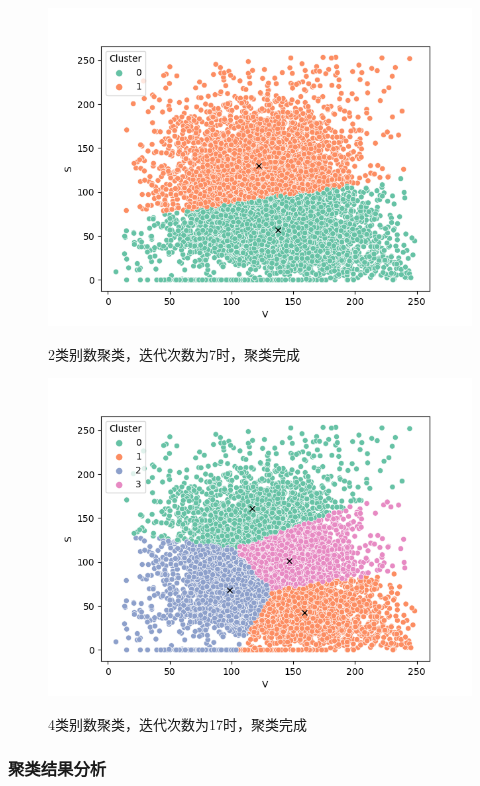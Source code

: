 \documentclass[UTF8]{ctexart}
\begin{document}
	\begin{figure}[htbp]
		\centering
		\caption{2类别数聚类，迭代次数为7时，聚类完成}
		\includegraphics[width=1.0\textwidth]{cluster_final2.png}
		\label{Fig.45}
	\end{figure}

	\begin{figure}[htbp]
	\centering
	\caption{4类别数聚类，迭代次数为17时，聚类完成}
	\includegraphics[width=1.0\textwidth]{cluster_final4.png}
	\label{Fig.46}
	\end{figure}

	\subsubsection{聚类结果分析}
	
\end{document}
